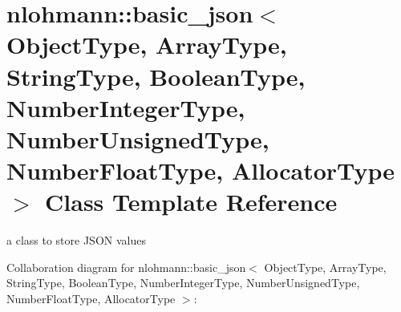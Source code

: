 \hypertarget{classnlohmann_1_1basic__json}{}\section{nlohmann\+:\+:basic\+\_\+json$<$ Object\+Type, Array\+Type, String\+Type, Boolean\+Type, Number\+Integer\+Type, Number\+Unsigned\+Type, Number\+Float\+Type, Allocator\+Type $>$ Class Template Reference}
\label{classnlohmann_1_1basic__json}


a class to store J\+S\+O\+N values  




Collaboration diagram for nlohmann\+:\+:basic\+\_\+json$<$ Object\+Type, Array\+Type, String\+Type, Boolean\+Type, Number\+Integer\+Type, Number\+Unsigned\+Type, Number\+Float\+Type, Allocator\+Type $>$\+:
